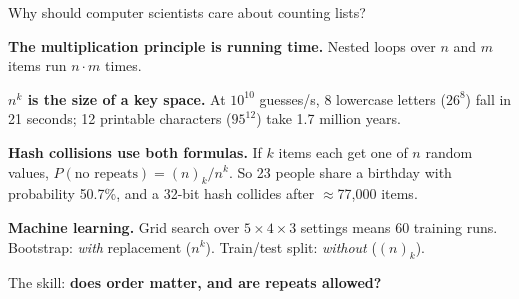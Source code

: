 \documentclass[dvipsnames, 10pt]{beamer}
\begin{document}
\begin{frame}{Why should computer scientists care about counting lists?}
\footnotesize

\begin{evidence}[blue]
\textbf{The multiplication principle is running time.}
Nested loops over $n$ and $m$ items run $n \cdot m$ times.%
\end{evidence}

\pause
\begin{evidence}[orange]
\textbf{$n^k$ is the size of a key space.}
At $10^{10}$ guesses/s, 8 lowercase letters ($26^8$) fall in \alert{21 seconds};
12 printable characters ($95^{12}$) take \alert{1.7 million years}.
\end{evidence}

\pause
\begin{evidence}[red]
\textbf{Hash collisions use both formulas.}
If $k$ items each get one of $n$ random values, $P(\text{no repeats}) = (n)_k / n^k$.
So 23 people share a birthday with probability \alert{50.7\%}, and a 32-bit hash
collides after $\approx$\alert{77,000} items.
\end{evidence}

\pause
\begin{evidence}[green]
\textbf{Machine learning.}
Grid search over $5 \times 4 \times 3$ settings means \alert{60} training runs.
Bootstrap: \emph{with} replacement ($n^k$).  Train/test split: \emph{without} ($(n)_k$).
\end{evidence}

\pause
{\centering The skill: \textbf{does order matter, and are repeats allowed?}\par}

\end{frame}
\end{document}
